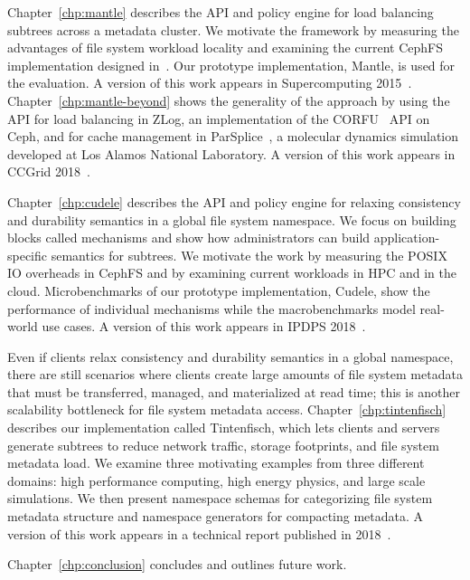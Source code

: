 Chapter~\ref{chp:mantle} describes the API and policy engine for load balancing
subtrees across a metadata cluster. We motivate the framework by measuring the
advantages of file system workload locality and examining the current CephFS
implementation designed in~\cite{weil:osdi2006-ceph, weil:sc2004-dyn-metadata}.
Our prototype implementation, Mantle, is used for the evaluation. A version of
this work appears in Supercomputing 2015~\cite{sevilla:sc15-mantle}.
Chapter~\ref{chp:mantle-beyond} shows the generality of the approach by using
the API for load balancing in ZLog, an implementation of the
CORFU~\cite{balakrishnan_corfu_2012} API on Ceph, and for cache management in
ParSplice~\cite{perez:jctc20150parsplice}, a molecular dynamics simulation
developed at Los Alamos National Laboratory. A version of this work appears in
CCGrid 2018~\cite{sevilla:ccgrid18-parsplice}.

Chapter~\ref{chp:cudele} describes the API and policy engine for relaxing
consistency and durability semantics in a global file system namespace. We
focus on building blocks called mechanisms and show how administrators can
build application-specific semantics for subtrees.  We motivate the work by
measuring the POSIX IO overheads in CephFS and by examining current workloads
in HPC and in the cloud. Microbenchmarks of our prototype implementation,
Cudele, show the performance of individual mechanisms while the macrobenchmarks
model real-world use cases. A version of this work appears in IPDPS
2018~\cite{sevilla:ipdps18-cudele}.

Even if clients relax consistency and durability semantics in a global
namespace, there are still scenarios where clients create large amounts of file
system metadata that must be transferred, managed, and materialized at read
time; this is another scalability bottleneck for file system metadata access.
Chapter~\ref{chp:tintenfisch} describes our implementation called Tintenfisch,
which lets clients and servers generate subtrees to reduce network traffic,
storage footprints, and file system metadata load. We examine three motivating
examples from three different domains: high performance computing, high energy
physics, and large scale simulations. We then present namespace schemas for
categorizing file system metadata structure and namespace generators for
compacting metadata. A version of this work appears in a technical report
published in 2018~\cite{sevilla:techreport18-tintenfisch}.

Chapter~\ref{chp:conclusion} concludes and outlines future work.

